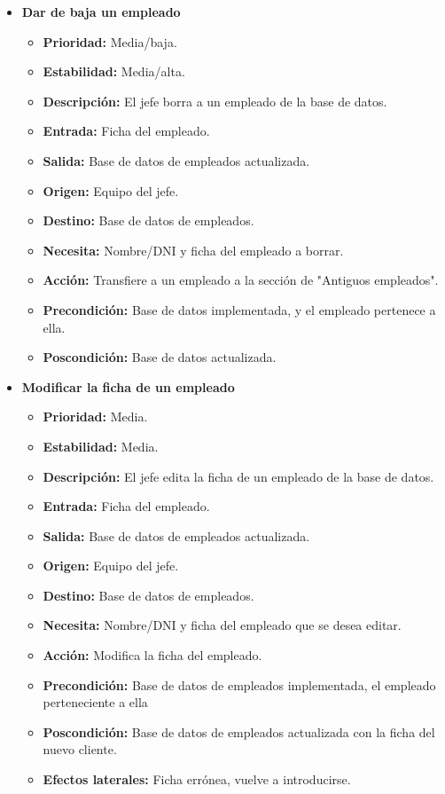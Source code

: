 \documentclass[spanish,a4paper,11pt, twoside]{report}	%
\begin{document}
\begin{itemize}
\begin{itemize}
		\end{itemize}%


		\item \textbf{Dar de baja un empleado}  %

		\begin{itemize}
			\item \textbf{Prioridad: }Media/baja.
			\item \textbf{Estabilidad: }Media/alta.
			\item \textbf{Descripción: }El jefe borra a un empleado de la base de datos.
			\item \textbf{Entrada: } Ficha del empleado.
			\item \textbf{Salida: }Base de datos de empleados actualizada.
			\item \textbf{Origen: }Equipo del jefe.
			\item \textbf{Destino: }Base de datos de empleados. 
			\item \textbf{Necesita: }Nombre/DNI y ficha del empleado a borrar. 
			\item \textbf{Acción: }Transfiere a un empleado a la sección de "Antiguos empleados".
			\item \textbf{Precondición: }Base de datos implementada, y el empleado pertenece a ella.
			\item \textbf{Poscondición: }Base de datos actualizada.

		\end{itemize}%

		\item \textbf{Modificar la ficha de un empleado}  %

		\begin{itemize}
			\item \textbf{Prioridad: }Media.
			\item \textbf{Estabilidad: }Media.
			\item \textbf{Descripción: }El jefe edita la ficha de un empleado de la base de datos.
			\item \textbf{Entrada: } Ficha del empleado.
			\item \textbf{Salida: }Base de datos de empleados actualizada.
			\item \textbf{Origen: }Equipo del jefe.
			\item \textbf{Destino: }Base de datos de empleados. 
			\item \textbf{Necesita: }Nombre/DNI y ficha del empleado que se desea editar. 
			\item \textbf{Acción: }Modifica la ficha del empleado.
			\item \textbf{Precondición: }Base de datos de empleados implementada, el empleado perteneciente a ella
			\item \textbf{Poscondición: }Base de datos de empleados actualizada con la ficha del nuevo cliente. 
			\item \textbf{Efectos laterales: } Ficha errónea, vuelve a introducirse.


\end{itemize}
\end{itemize}
\end{document}
